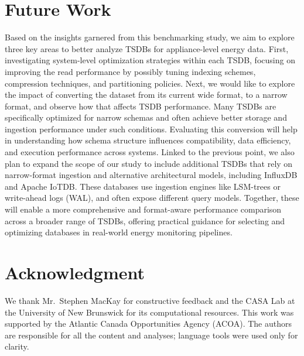 \documentclass[conference]{IEEEtran}
\begin{document}
\section{Future Work}\label{sec:future}
Based on the insights garnered from this benchmarking study, we aim to explore three key areas to better analyze TSDBs for appliance-level energy data. 
First, investigating system-level optimization strategies within each TSDB, focusing on improving the read performance by possibly tuning indexing schemes, compression techniques, and partitioning policies. 
Next, we would like to explore the impact of converting the dataset from its current wide format, to a narrow format, and observe how that affects TSDB performance. Many TSDBs are specifically optimized for narrow schemas and often achieve better storage and ingestion performance under such conditions. Evaluating this conversion will help in understanding how schema structure influences compatibility, data efficiency, and execution performance across systems.
Linked to the previous point, we also plan to expand the scope of our study to include additional TSDBs that rely on narrow-format ingestion and alternative architectural models, including InfluxDB and Apache IoTDB\@. These databases use ingestion engines like LSM-trees or write-ahead logs (WAL), and often expose different query models. Together, these will enable a more comprehensive and format-aware performance comparison across a broader range of TSDBs, offering practical guidance for selecting and optimizing databases in real-world energy monitoring pipelines.

\section*{Acknowledgment}
We thank Mr.~Stephen MacKay for constructive feedback and the CASA Lab at the University of New Brunswick for its computational resources. This work was supported by the Atlantic Canada Opportunities Agency (ACOA). The authors are responsible for all the content and analyses; language tools were used only for clarity.
\end{document}
